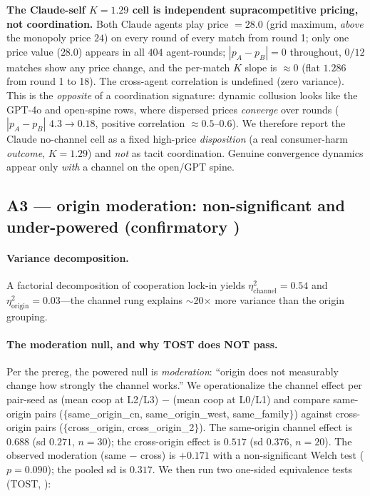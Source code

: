 \noindent\textbf{The Claude-self $K{=}1.29$ cell is independent supracompetitive pricing, not
coordination.} Both Claude agents play price $=28.0$ (grid maximum, \emph{above} the monopoly
price $24$) on every round of every match from round 1; only one price value ($28.0$) appears in
all $404$ agent-rounds; $|p_A-p_B|=0$ throughout, $0/12$ matches show any price change, and the
per-match $K$ slope is $\approx0$ (flat $1.286$ from round 1 to 18). The cross-agent correlation
is undefined (zero variance). This is the \emph{opposite} of a coordination signature: dynamic
collusion looks like the GPT-4o and open-spine rows, where dispersed prices \emph{converge} over
rounds ($|p_A-p_B|$ $4.3\to0.18$, positive correlation $\approx0.5$--$0.6$). We therefore report
the Claude no-channel cell as a fixed high-price \emph{disposition} (a real consumer-harm
\emph{outcome}, $K{=}1.29$) and \emph{not} as tacit coordination. Genuine convergence dynamics
appear only \emph{with} a channel on the open/GPT spine.

\subsection{A3 --- origin moderation: non-significant and under-powered (confirmatory \tC)}
\label{app:a3}

\paragraph{Variance decomposition.} A factorial decomposition of cooperation lock-in yields
$\eta^2_{\text{channel}}=0.54$ and $\eta^2_{\text{origin}}=0.03$---the channel rung explains
$\sim$20$\times$ more variance than the origin grouping.

\paragraph{The moderation null, and why TOST does NOT pass.}
Per the prereg, the powered null is \emph{moderation}: ``origin does not measurably change how
strongly the channel works.'' We operationalize the channel effect per pair-seed as
(mean coop at L2/L3) $-$ (mean coop at L0/L1) and compare same-origin pairs
($\{$same\_origin\_cn, same\_origin\_west, same\_family$\}$) against cross-origin pairs
($\{$cross\_origin, cross\_origin\_2$\}$). The same-origin channel effect is $0.688$ (sd $0.271$,
$n{=}30$); the cross-origin effect is $0.517$ (sd $0.376$, $n{=}20$). The observed moderation
(same $-$ cross) is $+0.171$ with a non-significant Welch test ($p{=}0.090$); the pooled sd is
$0.317$. We then run two one-sided equivalence tests (TOST,
\citealp{lakens2017tost,lakens2018equivalence}):

